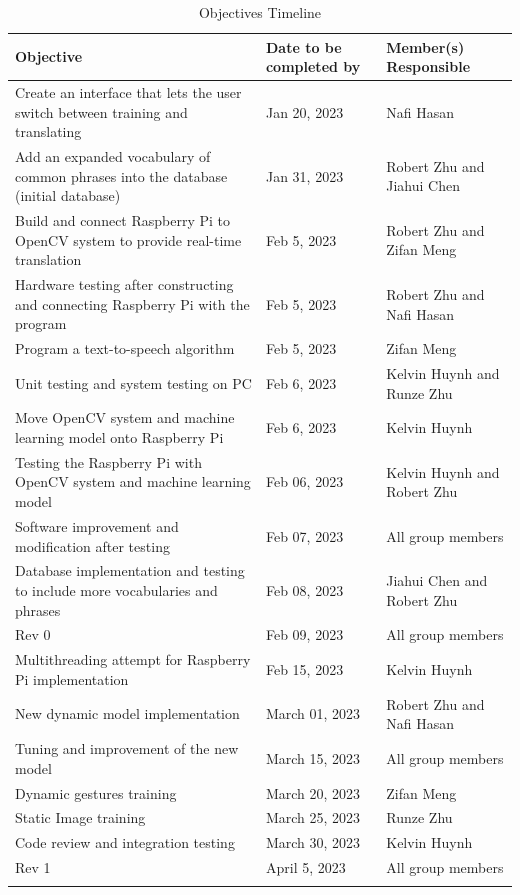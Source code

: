 \documentclass[12pt, titlepage]{article}
\begin{document}
\renewcommand{\arraystretch}{1.2}
\noindent \begin{longtable}{p{}|p{}|p{}}
\hline
\textbf{Objective} & \textbf{Date to be completed by} & \textbf{Member(s) Responsible}\\
\hline
Create an interface that lets the user switch between training and translating & Jan 20, 2023 & Nafi Hasan\\
\hline
Add an expanded vocabulary of common phrases into the database (initial database) & Jan 31, 2023 & Robert Zhu and Jiahui Chen\\
\hline
Build and connect Raspberry Pi to OpenCV system to provide real-time translation & Feb 5, 2023 & Robert Zhu and Zifan Meng\\
\hline
Hardware testing after constructing and connecting Raspberry Pi with the program & Feb 5, 2023 & Robert Zhu and Nafi Hasan\\
\hline
Program a text-to-speech algorithm & Feb 5, 2023 & Zifan Meng\\
\hline
Unit testing and system testing on PC & Feb 6, 2023 & Kelvin Huynh and Runze Zhu\\
\hline
Move OpenCV system and machine learning model onto Raspberry Pi & Feb 6, 2023 & Kelvin Huynh\\
\hline
Testing the Raspberry Pi with OpenCV system and machine learning model & Feb 06, 2023 & Kelvin Huynh and Robert Zhu\\
\hline
Software improvement and modification after testing & Feb 07, 2023 & All group members\\
\hline
Database implementation and testing to include more vocabularies and phrases & Feb 08, 2023 & Jiahui Chen and Robert Zhu\\
\hline
Rev 0 & Feb 09, 2023 & All group members\\
\hline
Multithreading attempt for Raspberry Pi implementation & Feb 15, 2023 & Kelvin Huynh\\
\hline
New dynamic model implementation & March 01, 2023 & Robert Zhu and Nafi Hasan\\
\hline
Tuning and improvement of the new model & March 15, 2023 & All group members\\
\hline
Dynamic gestures training & March 20, 2023 & Zifan Meng\\
\hline
Static Image training & March 25, 2023 & Runze Zhu\\
\hline
Code review and integration testing & March 30, 2023 & Kelvin Huynh\\
\hline
Rev 1 & April 5, 2023 & All group members\\
\hline
\caption{Objectives Timeline}
\end{longtable}
\end{document}

